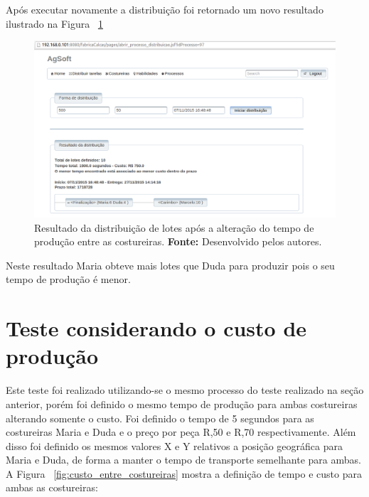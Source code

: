 \par Após executar novamente a distribuição foi retornado um novo resultado
ilustrado na Figura ~\ref{fig:novo_resultado_distribuicao_teste1}

\newpage

\begin{figure}[h!]
	\centerline{\includegraphics[scale=0.3]{./imagens/novo_resultado_alterado_tempo_teste1.png}}
	\caption[Resultado da distribuição de lotes após a alteração do tempo de
	produção entre as costureiras.]
	{Resultado da distribuição de lotes após a alteração do tempo de
	produção entre as costureiras. \textbf{Fonte:} Desenvolvido pelos autores.}
	\label{fig:novo_resultado_distribuicao_teste1}
\end{figure}

\par Neste resultado Maria obteve mais lotes que Duda para produzir pois o seu tempo de produção é menor.

\section{Teste considerando o custo de produção}

\par Este teste foi realizado utilizando-se o mesmo processo do teste realizado na seção anterior,
porém foi definido o mesmo tempo de produção para ambas costureiras alterando somente o custo. Foi definido 
o tempo de 5 segundos para as costureiras Maria e Duda e o preço por peça R,50 e R,70 respectivamente. Além disso foi definido os mesmos valores X e Y relativos a posição geográfica para 
Maria e Duda, de forma a manter o tempo de transporte semelhante para ambas. 
A Figura ~\ref{fig:custo_entre_costureiras} mostra a definição de tempo e custo para ambas as costureiras:

